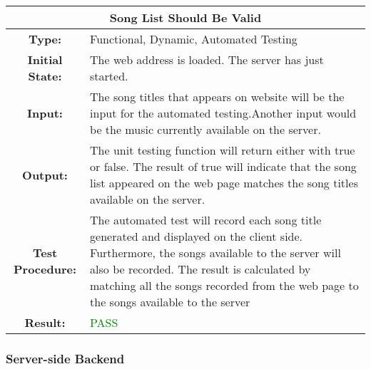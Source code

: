 \documentclass[12pt, titlepage]{article}
\begin{document}
\begin{center}
\begin{table}[H]
\begin{tabularx}{\textwidth}{| c X |}
\hline
\multicolumn{2}{|c|}{\textbf{Song List Should Be Valid}}\\
\hline
\textbf{Type: } & Functional, Dynamic, Automated Testing\\


\textbf{Initial State: } & The web address is loaded. The server has just started.\\


\textbf{Input: } & The song titles that appears on website will be the input for the automated testing.Another input would be the music currently available on the server.\\


\textbf{Output: } & The unit testing function will return either with true or false. The result of true will indicate that the song list appeared on the web page matches the song titles available on the server.\\


\textbf{Test Procedure:  } & The automated test will record each song title generated and displayed on the client side. Furthermore, the songs available to the server will also be recorded. The result is calculated by matching all the songs recorded from the web page to the songs available to the server\\


\textbf{Result: } & \textcolor{green}{PASS}\\
\hline
\end{tabularx}
\end{table}
\end{center}

\subsubsection{Server-side Backend}
\end{document}
